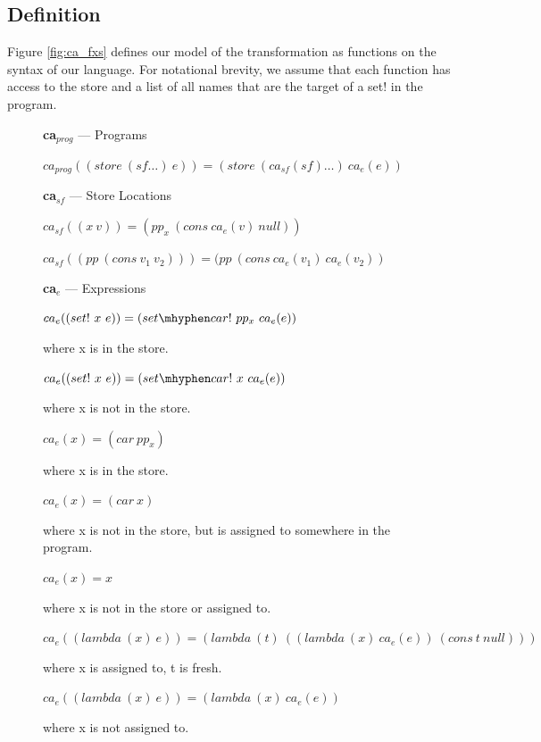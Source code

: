 \subsection{Definition}
Figure \ref{fig:ca_fxs} defines our model of the transformation as functions on the syntax of our language. For notational brevity, we assume that each function has access to the store and a list of all names that are the target of a set! in the program.
\begin{figure}
    \centering
\begin{definition} {\large\textbf{ca$_{prog}$}} --- Programs

$ca_{prog}((store\ (sf \dots)\ e)) = (store\ (ca_{sf}(sf) \dots)\ ca_e(e)) $

\end{definition}

\begin{definition} {\large\textbf{ca$_{sf}$}} --- Store Locations

$ca_{sf}((x\ v)) = (pp_x\ (cons\ ca_e(v)\ null))$

$ca_{sf}((pp\ (cons\ v_1\ v_2))) = (pp\ (cons\ ca_e(v_1)\ ca_e(v_2))$
\end{definition}

\begin{definition} {\large\textbf{ca$_e$}} --- Expressions

$ca_e((set!\ x\ e)) = (set \mhyphen car!\ pp_x\ ca_e(e))$

\qquad where x is in the store.

$ca_e((set!\ x\ e)) = (set \mhyphen car!\ x\ ca_e(e))$

\qquad where x is not in the store.

$ca_e(x) = (car\ pp_x)$

\qquad where x is in the store.

$ca_e(x) = (car\ x)$

\qquad where x is not in the store, but is assigned to somewhere in the program.

$ca_e(x) = x$

\qquad where x is not in the store or assigned to.

$ca_e((lambda\ (x)\ e)) = (lambda\ (t)\ ((lambda\ (x)\ ca_e(e))\ (cons\ t\ null)))$

\qquad where x is assigned to, t is fresh.

$ca_e((lambda\ (x)\ e)) = (lambda\ (x)\ ca_e(e))$ 

\qquad where x is not assigned to.


\end{definition}
\end{figure}
